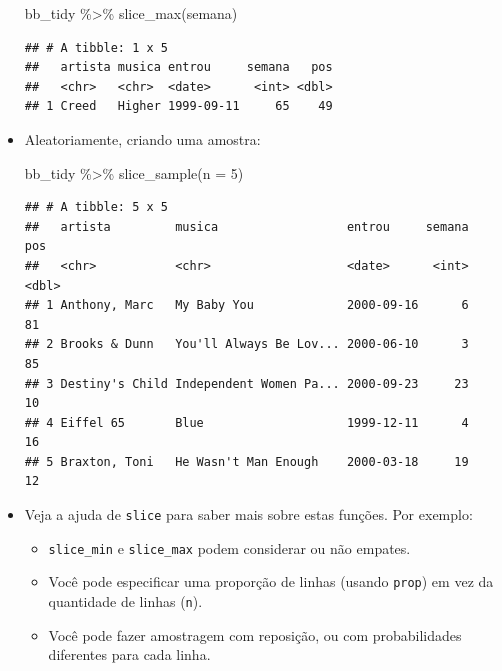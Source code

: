\documentclass[
  11pt]{report}
\newenvironment{Shaded}{\begin{snugshade}}{\end{snugshade}}
\newcommand{\AttributeTok}[1]{\textcolor[rgb]{0.77,0.63,0.00}{#1}}
\newcommand{\DecValTok}[1]{\textcolor[rgb]{0.00,0.00,0.81}{#1}}
\newcommand{\FunctionTok}[1]{\textcolor[rgb]{0.00,0.00,0.00}{#1}}
\newcommand{\NormalTok}[1]{#1}
\newcommand{\SpecialCharTok}[1]{\textcolor[rgb]{0.00,0.00,0.00}{#1}}
\renewenvironment{Shaded}{
    \begin{mdframed}[%
      roundcorner=2pt,%
      innerleftmargin=5pt,%
      innerrightmargin=5pt,%
      topline=true,%
      leftline=true,%
      rightline=true,%
      bottomline=true,%
      linewidth=0.5pt,%
      linecolor=black!20,%
      backgroundcolor=black!2,%
      skipabove=2ex,%
      skipbelow=2.5ex%
    ]%
  }
  {
    \end{mdframed}
  }
\begin{document}
\begin{itemize}
\begin{Shaded}
\begin{Highlighting}[]
\NormalTok{bb\_tidy }\SpecialCharTok{\%\textgreater{}\%} 
  \FunctionTok{slice\_max}\NormalTok{(semana)}
\end{Highlighting}
\end{Shaded}

\begin{verbatim}
## # A tibble: 1 x 5
##   artista musica entrou     semana   pos
##   <chr>   <chr>  <date>      <int> <dbl>
## 1 Creed   Higher 1999-09-11     65    49
\end{verbatim}
\item
  Aleatoriamente, criando uma amostra:

\begin{Shaded}
\begin{Highlighting}[]
\NormalTok{bb\_tidy }\SpecialCharTok{\%\textgreater{}\%} 
  \FunctionTok{slice\_sample}\NormalTok{(}\AttributeTok{n =} \DecValTok{5}\NormalTok{)}
\end{Highlighting}
\end{Shaded}

\begin{verbatim}
## # A tibble: 5 x 5
##   artista         musica                  entrou     semana   pos
##   <chr>           <chr>                   <date>      <int> <dbl>
## 1 Anthony, Marc   My Baby You             2000-09-16      6    81
## 2 Brooks & Dunn   You'll Always Be Lov... 2000-06-10      3    85
## 3 Destiny's Child Independent Women Pa... 2000-09-23     23    10
## 4 Eiffel 65       Blue                    1999-12-11      4    16
## 5 Braxton, Toni   He Wasn't Man Enough    2000-03-18     19    12
\end{verbatim}
\item
  Veja a ajuda de \texttt{slice} para saber mais sobre estas funções. Por exemplo:

  \begin{itemize}
  \item
    \texttt{slice\_min} e \texttt{slice\_max} podem considerar ou não empates.
  \item
    Você pode especificar uma proporção de linhas (usando \texttt{prop}) em vez da quantidade de linhas (\texttt{n}).
  \item
    Você pode fazer amostragem com reposição, ou com probabilidades diferentes para cada linha.
  \end{itemize}
\end{itemize}
\end{document}
